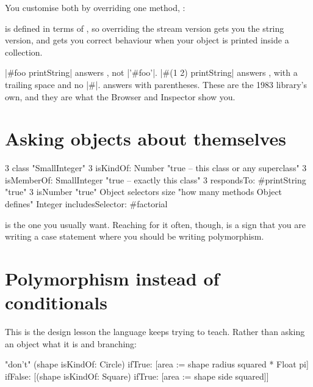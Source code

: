 You customise both by overriding one method, :


 is defined in terms of , so overriding the
stream version gets you the string version, and gets you correct behaviour
when your object is printed inside a collection.

\begin{stnote}
\ct|#foo printString| answers , not \ct|'#foo'|. \ct|#(1 2) printString| answers , with a trailing space and no \ct|#|.
 answers  with parentheses. These are the
1983 library's own, and they are what the Browser and Inspector show you.
\end{stnote}

\section{Asking objects about themselves}

\begin{st}
3 class                          "SmallInteger"
3 isKindOf: Number               "true  -- this class or any superclass"
3 isMemberOf: SmallInteger       "true  -- exactly this class"
3 respondsTo: #printString       "true"
3 isNumber                       "true"
Object selectors size            "how many methods Object defines"
Integer includesSelector: #factorial
\end{st}

 is the one you usually want. Reaching for it often, though, is
a sign that you are writing a case statement where you should be writing
polymorphism.

\section{Polymorphism instead of conditionals}

This is the design lesson the language keeps trying to teach. Rather than
asking an object what it is and branching:

\begin{st}
"don't"
(shape isKindOf: Circle)
    ifTrue: [area := shape radius squared * Float pi]
    ifFalse: [(shape isKindOf: Square)
        ifTrue: [area := shape side squared]]
\end{st}

